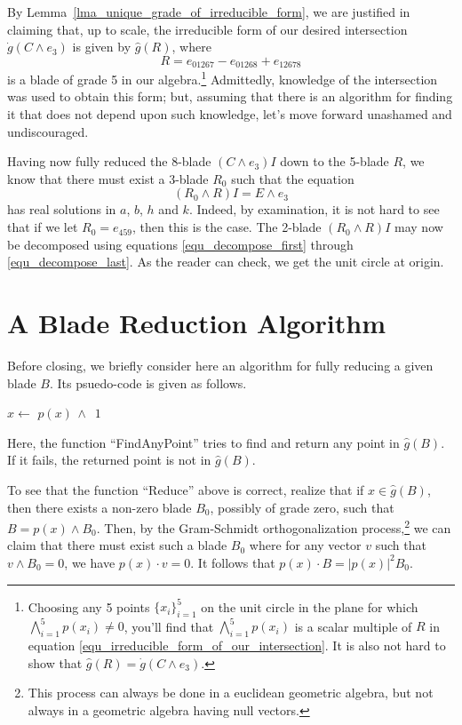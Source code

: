 \documentclass{birkjour}
\theoremstyle{definition}
\theoremstyle{remark}
\numberwithin{equation}{section}
\newcommand{\gd}{\dot{g}}
\newcommand{\gh}{\hat{g}}
\begin{document}
By Lemma~\ref{lma_unique_grade_of_irreducible_form}, we are justified in
claiming that, up to scale, the irreducible form of
our desired intersection $\gd(C\wedge e_3)$ is given by $\gh(R)$, where
\begin{equation}\label{equ_irreducible_form_of_our_intersection}
R = e_{01267} - e_{01268} + e_{12678}
\end{equation}
is a blade of grade 5 in our algebra.\footnote{Choosing any 5 points $\{x_i\}_{i=1}^5$ on
the unit circle in the plane for which $\bigwedge_{i=1}^5 p(x_i)\neq 0$, you'll find that $\bigwedge_{i=1}^5 p(x_i)$
is a scalar multiple of $R$ in equation \eqref{equ_irreducible_form_of_our_intersection}.  It is also not
hard to show that $\gh(R)=\gd(C\wedge e_3)$.}
Admittedly, knowledge of the intersection was used
to obtain this form; but, assuming that there is an algorithm for finding it
that does not depend upon such knowledge, let's move forward unashamed
and undiscouraged.

Having now fully reduced the 8-blade $(C\wedge e_3)I$ down to the 5-blade $R$, we know
that there must exist a 3-blade $R_0$ such that the equation
\begin{equation*}
(R_0\wedge R)I = E\wedge e_3
\end{equation*}
has real solutions in $a$, $b$, $h$ and $k$.
Indeed, by examination, it is not hard to see that if we let $R_0=e_{459}$, then this is the case.
The 2-blade $(R_0\wedge R)I$ may now be decomposed using equations \eqref{equ_decompose_first} through \eqref{equ_decompose_last}.
As the reader can check, we get the unit circle at origin.

\section{A Blade Reduction Algorithm}

Before closing, we briefly consider here an algorithm for fully reducing a given blade $B$.
Its psuedo-code is given as follows.

\begin{algorithmic}
	\State $x\gets$
		\State\Return $p(x)\,\wedge\,$
	\EndIf
	\State\Return $1$
\EndFunction
\end{algorithmic}
Here, the function ``FindAnyPoint'' tries to find and return any point in $\gh(B)$.
If it fails, the returned point is not in $\gh(B)$.

To see that the function ``Reduce'' above is correct, realize that if
$x\in\gh(B)$, then there exists a non-zero blade $B_0$, possibly of grade zero, such that $B=p(x)\wedge B_0$.
Then, by the Gram-Schmidt orthogonalization process,\footnote{This process can always be done in a euclidean geometric algebra,
but not always in a geometric algebra having null vectors.} we can claim that there must exist such a blade $B_0$
where for any vector $v$ such that $v\wedge B_0=0$, we have $p(x)\cdot v=0$.  It follows that
$p(x)\cdot B = |p(x)|^2B_0$.
\end{document}

